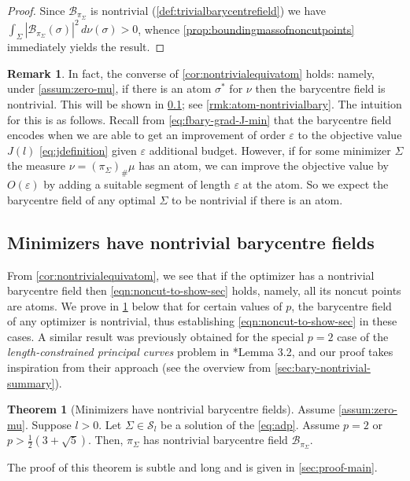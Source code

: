 \documentclass[preprint, reqno]{amsart}
\renewcommand{\epsilon}{\varepsilon}
\newcommand{\lbonpval}{\frac{1}{2}(3+\sqrt{5})}
\theoremstyle{definition}
\newtheorem{theorem}[definition]{Theorem}
\newtheorem{remark}[definition]{Remark}
\numberwithin{equation}{section}
\begin{document}
\begin{proof}
  Since $\mathcal{B}_{\pi_{\Sigma}}$ is nontrivial
  (\cref{def:trivialbarycentrefield}) we have $\int_\Sigma |\mathcal
  B_{\pi_\Sigma}(\sigma)|^2 \, d\nu(\sigma) > 0$, whence
  \cref{prop:boundingmassofnoncutpoints} immediately yields the
  result.
\end{proof}
\begin{remark}
  In fact, the converse of \cref{cor:nontrivialequivatom} holds:
  namely, under \eqref{assum:zero-mu}, if there is an atom $\sigma^*$
  for $\nu$ then the barycentre field is nontrivial. This will be
  shown in \cref{subsec:minimizershavenontrivialbarycentrefields}; see
  \cref{rmk:atom-nontrivialbary}. The intuition for this is as
  follows. Recall from \eqref{eq:fbary-grad-J-min} that the barycentre
  field encodes when we are able to get an improvement of order
  $\epsilon$ to the objective value $J(l)$ \eqref{eq:jdefinition}
  given $\epsilon$ additional budget. However, if for some minimizer
  $\Sigma$ the measure $\nu = (\pi_{\Sigma})_{\#}\mu$ has an atom, we
  can improve the objective value by $O(\epsilon)$ by adding a
  suitable segment of length $\epsilon$ at the atom. So we expect the
  barycentre field of any optimal $\Sigma$ to be nontrivial if there
  is an atom.
\end{remark}




\subsection{Minimizers have nontrivial barycentre
  fields}\label{subsec:minimizershavenontrivialbarycentrefields}

From \cref{cor:nontrivialequivatom}, we see that if the optimizer has
a nontrivial barycentre field then \eqref{eqn:noncut-to-show-sec}
holds, namely, all its noncut points are atoms. We prove in
\cref{nontrivialbarycentre} below that for certain values of $p$, the
barycentre field of any optimizer is nontrivial, thus establishing
\eqref{eqn:noncut-to-show-sec} in these cases. A similar result was
previously obtained for the special $p=2$ case of the
\emph{length-constrained principal curves} problem in
\cite{Delattre17}*{Lemma 3.2}, and our proof takes inspiration from
their approach (see the overview from
\cref{sec:bary-nontrivial-summary}).

\begin{theorem}[Minimizers have nontrivial barycentre
  fields]\label{nontrivialbarycentre} Assume \eqref{assum:zero-mu}.
  Suppose $l > 0$. Let $\Sigma \in \mathcal{S}_l$ be a solution of the
  \eqref{eq:adp}. Assume $p = 2$ or $p > \lbonpval$. Then,
  $\pi_{\Sigma}$ has nontrivial barycentre field
  $\mathcal{B}_{\pi_\Sigma}$.
\end{theorem}
The proof of this theorem is subtle and long and is given in
\cref{sec:proof-main}.
\end{document}
